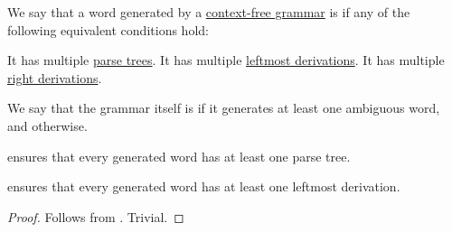 \begin{definition}\label{def:grammar_ambiguity}
  We say that a word generated by a \hyperref[def:chomsky_hierarchy/context_free]{context-free grammar} is  if any of the following equivalent conditions hold:
  \begin{thmenum}
     It has multiple \hyperref[def:parse_tree]{parse trees}.
     It has multiple \hyperref[def:leftmost_derivation]{leftmost derivations}.
     It has multiple \hyperref[def:leftmost_derivation]{right derivations}.
  \end{thmenum}

  We say that the grammar itself is  if it generates at least one ambiguous word, and  otherwise.
\end{definition}
\begin{comments}
  \item {} ensures that every generated word has at least one parse tree.
  \item {} ensures that every generated word has at least one leftmost derivation.
\end{comments}
\begin{proof}
   Follows from .
   Trivial.
\end{proof}

